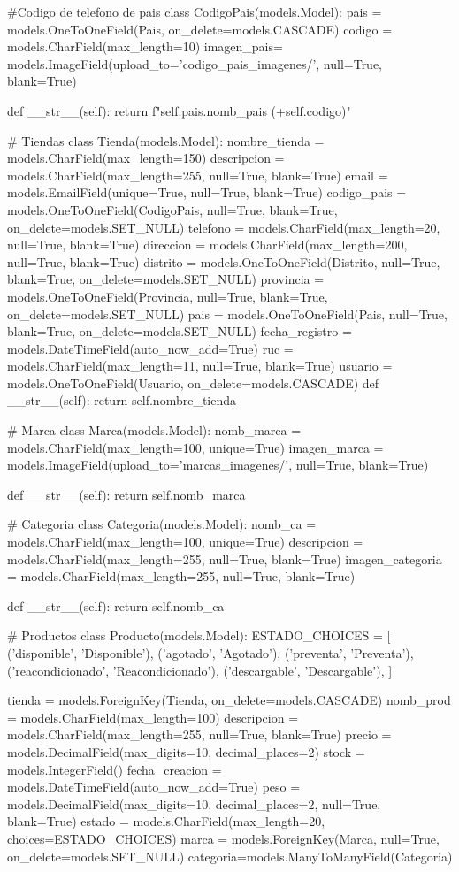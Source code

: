 #Codigo de telefono de pais
class CodigoPais(models.Model):
    pais = models.OneToOneField(Pais, on_delete=models.CASCADE)
    codigo = models.CharField(max_length=10)
    imagen_pais= models.ImageField(upload_to='codigo_pais_imagenes/', null=True, blank=True)

    def __str__(self):
        return f"{self.pais.nomb_pais} (+{self.codigo})"

# Tiendas
class Tienda(models.Model):
    nombre_tienda = models.CharField(max_length=150)
    descripcion = models.CharField(max_length=255, null=True, blank=True)
    email = models.EmailField(unique=True, null=True, blank=True)
    codigo_pais = models.OneToOneField(CodigoPais, null=True, blank=True, on_delete=models.SET_NULL)
    telefono = models.CharField(max_length=20, null=True, blank=True)
    direccion = models.CharField(max_length=200, null=True, blank=True)
    distrito = models.OneToOneField(Distrito, null=True, blank=True, on_delete=models.SET_NULL)
    provincia = models.OneToOneField(Provincia, null=True, blank=True, on_delete=models.SET_NULL)
    pais = models.OneToOneField(Pais, null=True, blank=True, on_delete=models.SET_NULL)
    fecha_registro = models.DateTimeField(auto_now_add=True)
    ruc = models.CharField(max_length=11, null=True, blank=True)
    usuario = models.OneToOneField(Usuario, on_delete=models.CASCADE)
    def __str__(self):
        return self.nombre_tienda

# Marca
class Marca(models.Model):
    nomb_marca = models.CharField(max_length=100, unique=True)
    imagen_marca = models.ImageField(upload_to='marcas_imagenes/', null=True, blank=True)

    def __str__(self):
        return self.nomb_marca

# Categoria
class Categoria(models.Model):
    nomb_ca = models.CharField(max_length=100, unique=True)
    descripcion = models.CharField(max_length=255, null=True, blank=True)
    imagen_categoria = models.CharField(max_length=255, null=True, blank=True)

    def __str__(self):
        return self.nomb_ca

# Productos
class Producto(models.Model):
    ESTADO_CHOICES = [
        ('disponible', 'Disponible'),
        ('agotado', 'Agotado'),
        ('preventa', 'Preventa'),
        ('reacondicionado', 'Reacondicionado'),
        ('descargable', 'Descargable'),
    ]
    
    tienda = models.ForeignKey(Tienda, on_delete=models.CASCADE)
    nomb_prod = models.CharField(max_length=100)
    descripcion = models.CharField(max_length=255, null=True, blank=True)
    precio = models.DecimalField(max_digits=10, decimal_places=2)
    stock = models.IntegerField()
    fecha_creacion = models.DateTimeField(auto_now_add=True)
    peso = models.DecimalField(max_digits=10, decimal_places=2, null=True, blank=True)
    estado = models.CharField(max_length=20, choices=ESTADO_CHOICES)
    marca = models.ForeignKey(Marca, null=True, on_delete=models.SET_NULL)
    categoria=models.ManyToManyField(Categoria)

